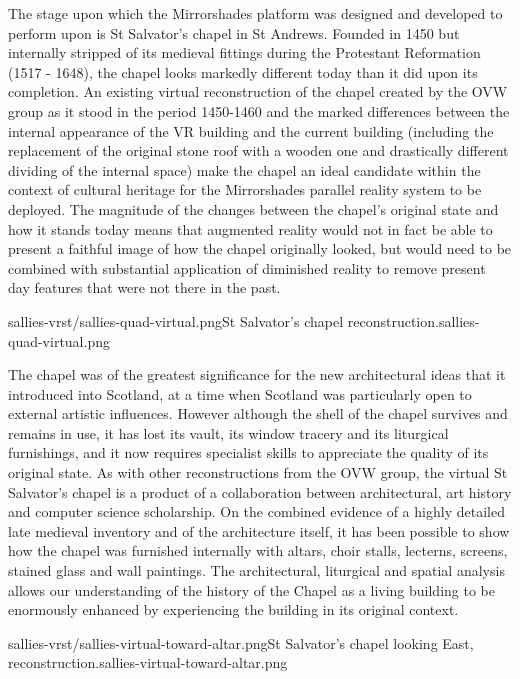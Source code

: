 The stage upon which the Mirrorshades platform was designed and developed to perform upon is St Salvator's chapel in St Andrews. Founded in 1450 but internally stripped of its medieval fittings during the Protestant Reformation (1517 - 1648), the chapel looks markedly different today than it did upon its completion. An existing virtual reconstruction of the chapel created by the OVW group as it stood in the period 1450-1460 and the marked differences between the internal appearance of the VR building and the current building (including the replacement of the original stone roof with a wooden one and drastically different dividing of the internal space) make the chapel an ideal candidate within the context of cultural heritage for the Mirrorshades parallel reality system to be deployed. The magnitude of the changes between the chapel's original state and how it stands today means that augmented reality would not in fact be able to present a faithful image of how the chapel originally looked, but would need to be combined with substantial application of diminished reality to remove present day features that were not there in the past.

       {sallies-vrst/sallies-quad-virtual.png}{St Salvator's chapel reconstruction.}{sallies-quad-virtual.png}
       
The chapel was of the greatest significance for the new architectural ideas that it introduced into Scotland, at a time when Scotland was particularly open to external artistic influences. However although the shell of the chapel survives and remains in use, it has lost its vault, its window tracery and its liturgical furnishings, and it now requires specialist skills to appreciate the quality of its original state. As with other reconstructions from the OVW group, the virtual St Salvator's chapel is a product of a collaboration between architectural, art history and computer science scholarship. On the combined evidence of a highly detailed late medieval inventory and of the architecture itself, it has been possible to show how the chapel was furnished internally with altars, choir stalls, lecterns, screens, stained glass and wall paintings. The architectural, liturgical and spatial analysis allows our understanding of the history of the Chapel as a living building to be enormously enhanced by experiencing the building in its original context.

       {sallies-vrst/sallies-virtual-toward-altar.png}{St Salvator's chapel looking East, reconstruction.}{sallies-virtual-toward-altar.png}

